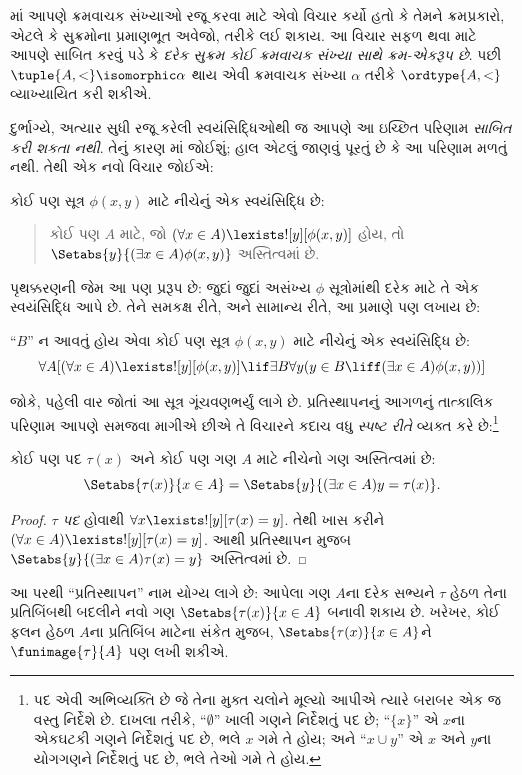 \documentclass[../../../include/open-logic-section]{subfiles}
\begin{document}

માં આપણે ક્રમવાચક સંખ્યાઓ રજૂ કરવા માટે
એવો વિચાર કર્યો હતો કે તેમને ક્રમપ્રકારો, એટલે કે સુક્રમોના પ્રમાણભૂત
અવેજો, તરીકે લઈ શકાય. આ વિચાર સફળ થવા માટે આપણે સાબિત કરવું પડે કે
\emph{દરેક સુક્રમ કોઈ ક્રમવાચક સંખ્યા સાથે ક્રમ-એકરૂપ છે}.
પછી $\tuple{A, <} \isomorphic \alpha$ થાય એવી ક્રમવાચક
સંખ્યા $\alpha$ તરીકે $\ordtype{A, <}$ વ્યાખ્યાયિત કરી શકીએ.

દુર્ભાગ્યે, અત્યાર સુધી રજૂ કરેલી સ્વયંસિદ્ધિઓથી જ આપણે આ ઇચ્છિત
પરિણામ \emph{સાબિત કરી શકતા નથી}. તેનું કારણ
માં જોઈશું; હાલ એટલું જાણવું
પૂરતું છે કે આ પરિણામ મળતું નથી. તેથી એક નવો વિચાર જોઈએ:

\begin{axiom}[પ્રતિસ્થાપનનું પ્રરૂપ]
કોઈ પણ સૂત્ર $\phi(x, y)$ માટે નીચેનું એક સ્વયંસિદ્ધિ છે:
\begin{quote}
	કોઈ પણ $A$ માટે, જો $(\forall x \in A)\lexists![y][\phi(x,y)]$ હોય, તો
	$\Setabs{y}{(\exists x \in A)\phi(x,y)}$ અસ્તિત્વમાં છે.
\end{quote}
\end{axiom}
\noindent
પૃથક્કરણની જેમ આ પણ પ્રરૂપ છે: જુદાં જુદાં અસંખ્ય $\phi$ સૂત્રોમાંથી
દરેક માટે તે એક સ્વયંસિદ્ધિ આપે છે. તેને સમકક્ષ રીતે, અને સામાન્ય રીતે,
આ પ્રમાણે પણ લખાય છે:

\begin{defish}
``$B$'' ન આવતું હોય એવા કોઈ પણ સૂત્ર $\phi(x,y)$ માટે નીચેનું એક સ્વયંસિદ્ધિ છે:
\[
\forall A[(\forall x \in A)\lexists![y][\phi(x,y)] \lif \exists B\forall y (y \in B \liff (\exists x \in A)\phi(x,y))]
\]
\end{defish}

જોકે, પહેલી વાર જોતાં આ સૂત્ર ગૂંચવણભર્યું લાગે છે. પ્રતિસ્થાપનનું
આગળનું તાત્કાલિક પરિણામ આપણે સમજવા માગીએ છીએ તે વિચારને કદાચ વધુ
\emph{સ્પષ્ટ રીતે} વ્યક્ત કરે છે:\footnote{પદ એવી અભિવ્યક્તિ છે
જે તેના મુક્ત ચલોને મૂલ્યો આપીએ ત્યારે બરાબર એક જ વસ્તુ નિર્દેશે છે.
દાખલા તરીકે, ``$\emptyset$'' ખાલી ગણને નિર્દેશતું પદ છે;
``$\{x\}$'' એ $x$ના એકઘટકી ગણને નિર્દેશતું પદ છે, ભલે $x$ ગમે તે હોય;
અને ``$x \cup y$'' એ $x$ અને $y$ના યોગગણને નિર્દેશતું પદ છે,
ભલે તેઓ ગમે તે હોય.}

\begin{cor}
કોઈ પણ પદ $\tau(x)$ અને કોઈ પણ ગણ $A$ માટે નીચેનો ગણ અસ્તિત્વમાં છે:
\[
	\Setabs{\tau(x)}{x \in A} = \Setabs{y}{(\exists x \in A)y = \tau(x)}.
\]
\end{cor}

\begin{proof}
$\tau$ \emph{પદ} હોવાથી $\forall x \lexists![y][\tau(x) = y]$.
તેથી ખાસ કરીને $(\forall x \in A)\lexists![y][\tau(x) = y]$.
આથી પ્રતિસ્થાપન મુજબ
$\Setabs{y}{(\exists x \in A)\tau(x) = y}$ અસ્તિત્વમાં છે.
\end{proof}
\noindent
આ પરથી ``પ્રતિસ્થાપન'' નામ યોગ્ય લાગે છે: આપેલા ગણ $A$ના દરેક સભ્યને
$\tau$ હેઠળ તેના પ્રતિબિંબથી બદલીને નવો ગણ
$\Setabs{\tau(x)}{x \in A}$ બનાવી શકાય છે. ખરેખર, કોઈ ફલન
હેઠળ $A$ના પ્રતિબિંબ માટેના સંકેત મુજબ, $\Setabs{\tau(x)}{x \in A}$ને
$\funimage{\tau}{A}$ પણ લખી શકીએ.
\end{document}

